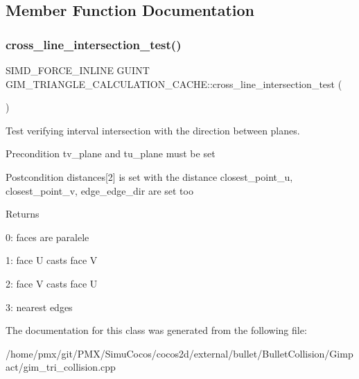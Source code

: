 \subsection{Member Function Documentation}
\mbox{\label{classGIM__TRIANGLE__CALCULATION__CACHE_a8ce209ccff8cdd7ece72b0465e222a85}} 
\subsubsection{\texorpdfstring{cross\+\_\+line\+\_\+intersection\+\_\+test()}{cross\_line\_intersection\_test()}}
{\footnotesize\ttfamily S\+I\+M\+D\+\_\+\+F\+O\+R\+C\+E\+\_\+\+I\+N\+L\+I\+NE G\+U\+I\+NT G\+I\+M\+\_\+\+T\+R\+I\+A\+N\+G\+L\+E\+\_\+\+C\+A\+L\+C\+U\+L\+A\+T\+I\+O\+N\+\_\+\+C\+A\+C\+H\+E\+::cross\+\_\+line\+\_\+intersection\+\_\+test (\begin{DoxyParamCaption}{ }\end{DoxyParamCaption})\hspace{0.3cm}{\ttfamily [inline]}}



Test verifying interval intersection with the direction between planes. 

\begin{DoxyPrecond}{Precondition}
tv\+\_\+plane and tu\+\_\+plane must be set 
\end{DoxyPrecond}
\begin{DoxyPostcond}{Postcondition}
distances\mbox{[}2\mbox{]} is set with the distance closest\+\_\+point\+\_\+u, closest\+\_\+point\+\_\+v, edge\+\_\+edge\+\_\+dir are set too 
\end{DoxyPostcond}
\begin{DoxyReturn}{Returns}

\begin{DoxyItemize}
\item 0\+: faces are paralele
\item 1\+: face U casts face V
\item 2\+: face V casts face U
\item 3\+: nearest edges 
\end{DoxyItemize}
\end{DoxyReturn}


The documentation for this class was generated from the following file\+:\begin{DoxyCompactItemize}
\item 
/home/pmx/git/\+P\+M\+X/\+Simu\+Cocos/cocos2d/external/bullet/\+Bullet\+Collision/\+Gimpact/gim\+\_\+tri\+\_\+collision.\+cpp\end{DoxyCompactItemize}
